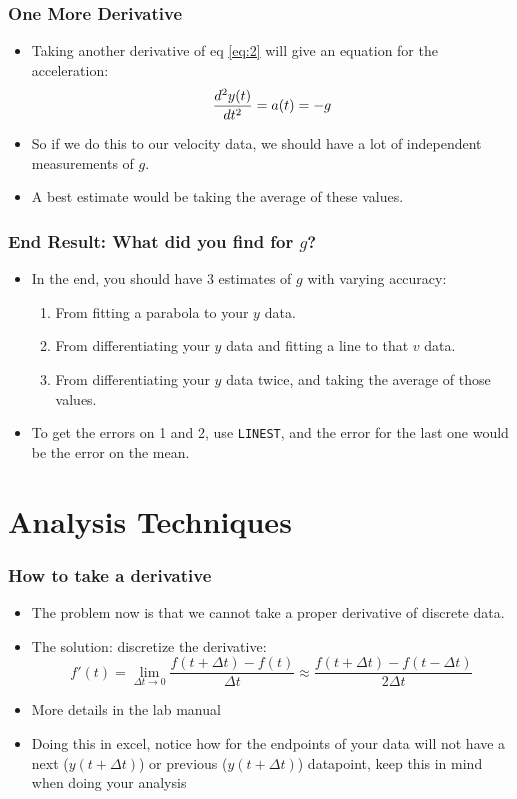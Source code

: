 \documentclass[aspectratio=169]{beamer}
\begin{document}
\begin{frame}
  \frametitle{One More Derivative}
  \begin{itemize}
  \item Taking another derivative of eq \eqref{eq:2} will give an equation for the acceleration:
    \begin{equation}
      \label{eq:4}
      \dv[2]{y(t)}{t}=a(t)=-g
    \end{equation}
  \item So if we do this to our velocity data, we should have a lot of independent measurements of $g$.
  \item A best estimate would be taking the average of these values.
  \end{itemize}
\end{frame}

\begin{frame}
  \frametitle{End Result: What did you find for $g$?}
  \begin{itemize}
  \item In the end, you should have 3 estimates of $g$ with varying accuracy:
    \begin{enumerate}
    \item From fitting a parabola to your $y$ data.
    \item From differentiating your $y$ data and fitting a line to that $v$ data.
    \item From differentiating your $y$ data twice, and taking the average of those values.
    \end{enumerate}
  \item To get the errors on 1 and 2, use \texttt{LINEST}, and the error for the last one would be the error on the mean. 
  \end{itemize}
\end{frame}

\section{Analysis Techniques}
\begin{frame}
  \frametitle{How to take a derivative}
  \begin{itemize}
  \item The problem now is that we cannot take a proper derivative of discrete data. 
  \item The solution: discretize the derivative:
    \begin{equation}
      \label{eq:3}
      f'(t)=\lim_{\Delta t\to0}\frac{f(t+\Delta t)-f(t)}{\Delta t}
      \approx \frac{f(t+\Delta t)-f(t-\Delta t)}{2\Delta t}
    \end{equation}
  \item More details in the lab manual
  \item Doing this in excel, notice how for the endpoints of your data will not have a next ($y(t+\Delta t)$) or previous ($y(t+\Delta t)$) datapoint, keep this in mind when doing your analysis
  \end{itemize}
\end{frame}
\end{document}
